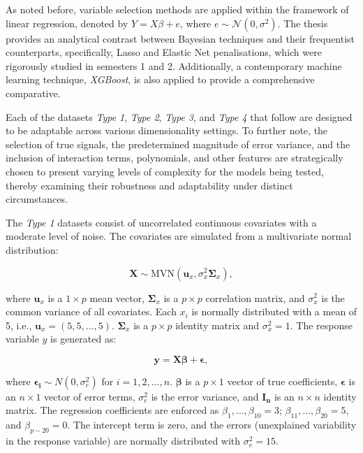 \documentclass[
  11pt,
]{article}
\begin{document}
As noted before, variable selection methods are applied within the
framework of linear regression, denoted by \(Y = X\beta + e\), where
\(e \sim \mathcal{N}(0, \sigma^2)\). The thesis provides an analytical
contrast between Bayesian techniques and their frequentist counterparts,
specifically, Lasso and Elastic Net penalisations, which were rigorously
studied in semesters 1 and 2. Additionally, a contemporary machine
learning technique, \emph{XGBoost}, is also applied to provide a
comprehensive comparative.

Each of the datasets \emph{Type 1}, \emph{Type 2}, \emph{Type 3}, and
\emph{Type 4} that follow are designed to be adaptable across various
dimensionality settings. To further note, the selection of true signals,
the predetermined magnitude of error variance, and the inclusion of
interaction terms, polynomials, and other features are strategically
chosen to present varying levels of complexity for the models being
tested, thereby examining their robustness and adaptability under
distinct circumstances.

\hfill\break
\hfill\break

The \emph{Type 1} datasets consist of uncorrelated continuous covariates
with a moderate level of noise. The covariates are simulated from a
multivariate normal distribution:

\begin{equation}
\mathbf{X} \sim \text{MVN}(\mathbf{u}_x, \sigma_x^2 \mathbf{\Sigma}_x),
\end{equation}

where \(\mathbf{u}_x\) is a \(1 \times p\) mean vector,
\(\mathbf{\Sigma}_x\) is a \(p \times p\) correlation matrix, and
\(\sigma_x^2\) is the common variance of all covariates. Each \(x_i\) is
normally distributed with a mean of 5, i.e.,
\(\mathbf{u}_x = (5, 5, \ldots, 5)\). \(\mathbf{\Sigma}_x\) is a
\(p \times p\) identity matrix and \(\sigma_x^2 = 1\). The response
variable \(y\) is generated as:

\begin{equation}
\mathbf{y} = \mathbf{X}\boldsymbol{\beta} + \boldsymbol{\epsilon},
\end{equation}

where \(\boldsymbol{\epsilon_i} \sim N(0, \sigma_e^2)\) for
\(i = 1, 2, \ldots, n\). \(\boldsymbol{\beta}\) is a \(p \times 1\)
vector of true coefficients, \(\boldsymbol{\epsilon}\) is an
\(n \times 1\) vector of error terms, \(\sigma_e^2\) is the error
variance, and \(\mathbf{I_n}\) is an \(n \times n\) identity matrix. The
regression coefficients are enforced as
\(\beta_1, \ldots, \beta_{10} = 3\);
\(\beta_{11}, \ldots, \beta_{20} = 5\), and \(\beta_{p-20} = 0\). The
intercept term is zero, and the errors (unexplained variability in the
response variable) are normally distributed with \(\sigma_e^2 = 15\).
\end{document}
